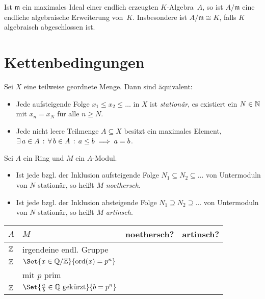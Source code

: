 \documentclass{cheat-sheet}
\newcommand{\cmark}{\ding{51}}
\newcommand{\xmark}{\ding{55}}
\DeclareMathOperator{\ord}{ord} %
\newcommand{\mmm}{\mathfrak{m}}
\begin{document}
\begin{kor}
  Ist $\mmm$ ein maximales Ideal einer endlich erzeugten $K$-Algebra~$A$, so ist $A/\mmm$ eine endliche algebraische Erweiterung von~$K$.
  Insbesondere ist $A/\mmm \cong K$, falls $K$ algebraisch abgeschlossen ist.
\end{kor}

\section{Kettenbedingungen}



\begin{prop}
  Sei $X$ eine teilweise geordnete Menge.
  Dann sind äquivalent:
  \begin{itemize}
    \item Jede aufsteigende Folge $x_1 \leq x_2 \leq \ldots$ in $X$ ist \emph{stationär}, \dh{} es existiert ein $N \in \mathbb{N}$ mit $x_n = x_N$ für alle $n \geq N$.
    \item Jede nicht leere Teilmenge $A \subseteq X$ besitzt ein maximales Element, \dh{} $\exists \, {a \in A} \,:\, \forall \, {b \in A} \,:\, a \leq b \implies a = b$.
  \end{itemize}
\end{prop}

\begin{defn}
  Sei $A$ ein Ring und $M$ ein $A$-Modul.
  \begin{itemize}
    \item Ist jede bzgl. der Inklusion aufsteigende Folge $N_1 \subseteq N_2 \subseteq \ldots$ von Untermoduln von $N$ stationär, so heißt $M$ \emph{noethersch}.
    \item Ist jede bzgl. der Inklusion absteigende Folge $N_1 \supseteq N_2 \supseteq \ldots$ von Untermoduln von $N$ stationär, so heißt $M$ \emph{artinsch}.
  \end{itemize}
\end{defn}

\begin{bspe}
  \begin{minipage}[t]{0.88 \linewidth}
    \begin{tabular}[t]{l | l | l | l}
      $A$ & $M$ & noethersch? & artinsch? \\ \hline
      $\mathbb{Z}$ & irgendeine endl. Gruppe & \cmark & \cmark \\
      $\mathbb{Z}$ & $\Set{x \in \Q/\Z}{\ord(x) = p^n}$ & \xmark & \cmark \\
      & mit $p$ prim & & \\
      $\mathbb{Z}$ & $\Set{\tfrac{a}{b} \in \Q \text{ gekürzt}}{b = p^n}$ & \xmark & \xmark
    \end{tabular}
  \end{minipage}
\end{bspe}
\end{document}

